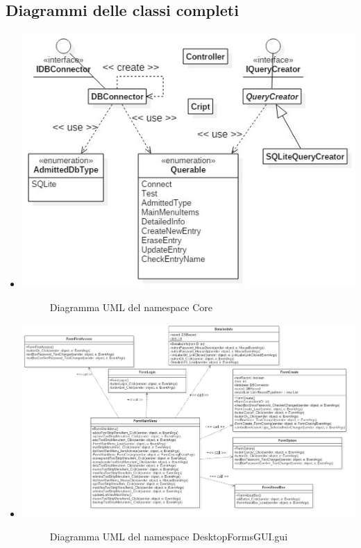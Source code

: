 \documentclass[a4paper,10pt]{report}
\begin{document}
		\subsection{Diagrammi delle classi completi}
			\begin{itemize}
				\item[] {
					\begin{center}
						\includegraphics[width=\textwidth]{immagini/Core.jpg}
						\end{center}
					\begin{figure}[!h]
						\caption{Diagramma UML del namespace Core}
						\end{figure}}
				\item[] {
					\begin{center}
						\includegraphics[width=\textwidth]{immagini/N2LDesktopFormsGUIguiClasses.jpg}
						\end{center}
					\begin{figure}[!h]
						\caption{Diagramma UML del namespace DesktopFormsGUI.gui}
						\end{figure}}
				\end{itemize}
\newpage
\end{document}
